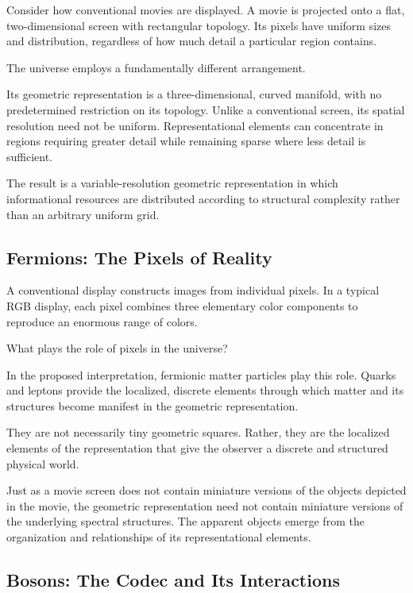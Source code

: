 Consider how conventional movies are displayed. A movie is projected onto a flat, two-dimensional screen with rectangular topology.
Its pixels have uniform sizes and distribution, regardless of how much detail a particular region contains.

The universe employs a fundamentally different arrangement.

Its geometric representation is a three-dimensional, curved manifold, with no predetermined restriction on its topology. Unlike a conventional screen, its spatial resolution need not be uniform.
Representational elements can concentrate in regions requiring greater detail while remaining sparse where less detail is sufficient.

The result is a variable-resolution geometric representation in which informational resources are distributed according to structural complexity rather than an arbitrary uniform grid.

\subsection*{Fermions: The Pixels of Reality}

A conventional display constructs images from individual pixels. In a typical RGB display, each pixel combines three elementary color components to reproduce an enormous range of colors.

What plays the role of pixels in the universe?

In the proposed interpretation, fermionic matter particles play this role. Quarks and leptons provide the localized, discrete elements through which matter and its structures become manifest in the geometric representation.

They are not necessarily tiny geometric squares. Rather, they are the localized elements of the representation that give the observer a discrete and structured physical world.

Just as a movie screen does not contain miniature versions of the objects depicted in the movie, the geometric representation need not contain miniature versions of the underlying spectral structures.
The apparent objects emerge from the organization and relationships of its representational elements.

\subsection*{Bosons: The Codec and Its Interactions}


